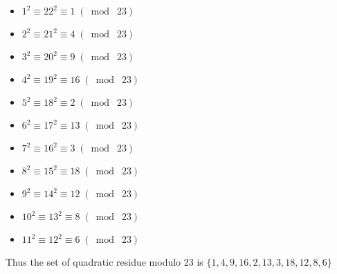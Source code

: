 \documentclass{article}
\begin{document}
\begin{itemize}
    \item $1^2 \equiv 22^2 \equiv 1 \;(\bmod\; 23)$
    \item $2^2 \equiv 21^2 \equiv 4 \;(\bmod\; 23)$
    \item $3^2 \equiv 20^2 \equiv 9 \;(\bmod\; 23)$
    \item $4^2 \equiv 19^2 \equiv 16 \;(\bmod\; 23)$
    \item $5^2 \equiv 18^2 \equiv 2 \;(\bmod\; 23)$
    \item $6^2 \equiv 17^2 \equiv 13 \;(\bmod\; 23)$
    \item $7^2 \equiv 16^2 \equiv 3 \;(\bmod\; 23)$
    \item $8^2 \equiv 15^2 \equiv 18 \;(\bmod\; 23)$
    \item $9^2 \equiv 14^2 \equiv 12 \;(\bmod\; 23)$
    \item $10^2 \equiv 13^2 \equiv 8 \;(\bmod\; 23)$
    \item $11^2 \equiv 12^2 \equiv 6 \;(\bmod\; 23)$
\end{itemize}
Thus the set of quadratic residue modulo 23 is $\{1,4,9,16,2,13,3,18,12,8,6\}$
\end{document}
